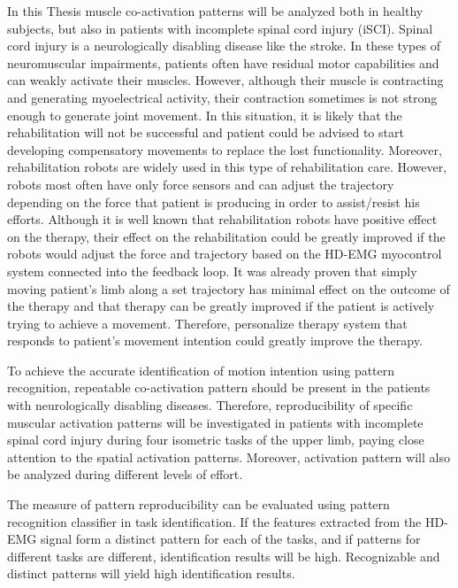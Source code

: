 In this Thesis muscle co-activation patterns will be analyzed both in healthy subjects, but also in patients with incomplete spinal cord injury (iSCI). Spinal cord injury is a neurologically disabling disease like the stroke. In these types of neuromuscular impairments, patients often have residual motor capabilities and can weakly activate their muscles. However, although their muscle is contracting and generating myoelectrical activity, their contraction sometimes is not strong enough to generate joint movement. In this situation, it is likely that the rehabilitation will not be successful and patient could be advised to start developing compensatory movements to replace the lost functionality. Moreover, rehabilitation robots are widely used in this type of rehabilitation care. However, robots most often have only force sensors and can adjust the trajectory depending on the force that patient is producing in order to assist/resist his efforts. Although it is well known that rehabilitation robots have positive effect on the therapy, their effect on the rehabilitation could be greatly improved if the robots would adjust the force and trajectory based on the HD-EMG myocontrol system connected into the feedback loop. It was already proven that simply moving patient's limb along a set trajectory has minimal effect on the outcome of the therapy and that therapy can be greatly improved if the patient is actively trying to achieve a movement. Therefore, personalize therapy system that responds to patient's movement intention could greatly improve the therapy.

To achieve the accurate identification of motion intention using pattern recognition, repeatable co-activation pattern should be present in the patients with neurologically disabling diseases. Therefore, reproducibility of specific muscular activation patterns will be investigated in patients with incomplete spinal cord injury during four isometric tasks of the upper limb, paying close attention to the spatial activation patterns. Moreover, activation pattern will also be analyzed during different levels of effort.

The measure of pattern reproducibility can be evaluated using pattern recognition classifier in task identification. If the features extracted from the HD-EMG signal form a distinct pattern for each of the tasks, and if patterns for different tasks are different, identification results will be high. Recognizable and distinct patterns will yield high identification results.
   
